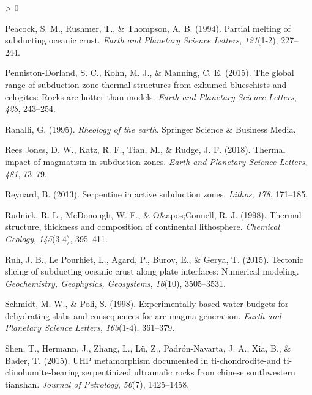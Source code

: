 \documentclass[draft,linenumbers]{agujournal2018}
\newlength{\cslhangindent}
\newenvironment{CSLReferences}[2] %
 {%
  \setlength{\parindent}{0pt}
  \ifodd #1 \everypar{\setlength{\hangindent}{\cslhangindent}}\ignorespaces\fi
  \ifnum #2 > 0
  \setlength{\parskip}{#2\baselineskip}
  \fi
 }%
 {}
\begin{document}
\begin{CSLReferences}{1}{0}
\leavevmode{}%
Peacock, S. M., Rushmer, T., \& Thompson, A. B. (1994). Partial melting
of subducting oceanic crust. \emph{Earth and Planetary Science Letters},
\emph{121}(1-2), 227--244.

\leavevmode{}%
Penniston-Dorland, S. C., Kohn, M. J., \& Manning, C. E. (2015). The
global range of subduction zone thermal structures from exhumed
blueschists and eclogites: Rocks are hotter than models. \emph{Earth and
Planetary Science Letters}, \emph{428}, 243--254.

\leavevmode{}%
Ranalli, G. (1995). \emph{Rheology of the earth}. Springer Science \&
Business Media.

\leavevmode{}%
Rees Jones, D. W., Katz, R. F., Tian, M., \& Rudge, J. F. (2018).
{Thermal impact of magmatism in subduction zones}. \emph{Earth and
Planetary Science Letters}, \emph{481}, 73--79.

\leavevmode{}%
Reynard, B. (2013). {Serpentine in active subduction zones}.
\emph{Lithos}, \emph{178}, 171--185.

\leavevmode{}%
Rudnick, R. L., McDonough, W. F., \& O\&apos;Connell, R. J. (1998).
{Thermal structure, thickness and composition of continental
lithosphere}. \emph{Chemical Geology}, \emph{145}(3-4), 395--411.

\leavevmode{}%
Ruh, J. B., Le Pourhiet, L., Agard, P., Burov, E., \& Gerya, T. (2015).
{Tectonic slicing of subducting oceanic crust along plate interfaces:
Numerical modeling}. \emph{Geochemistry, Geophysics, Geosystems},
\emph{16}(10), 3505--3531.

\leavevmode{}%
Schmidt, M. W., \& Poli, S. (1998). {Experimentally based water budgets
for dehydrating slabs and consequences for arc magma generation}.
\emph{Earth and Planetary Science Letters}, \emph{163}(1-4), 361--379.

\leavevmode{}%
Shen, T., Hermann, J., Zhang, L., Lü, Z., Padrón-Navarta, J. A., Xia,
B., \& Bader, T. (2015). UHP metamorphism documented in
ti-chondrodite-and ti-clinohumite-bearing serpentinized ultramafic rocks
from chinese southwestern tianshan. \emph{Journal of Petrology},
\emph{56}(7), 1425--1458.


\end{CSLReferences}
\end{document}

